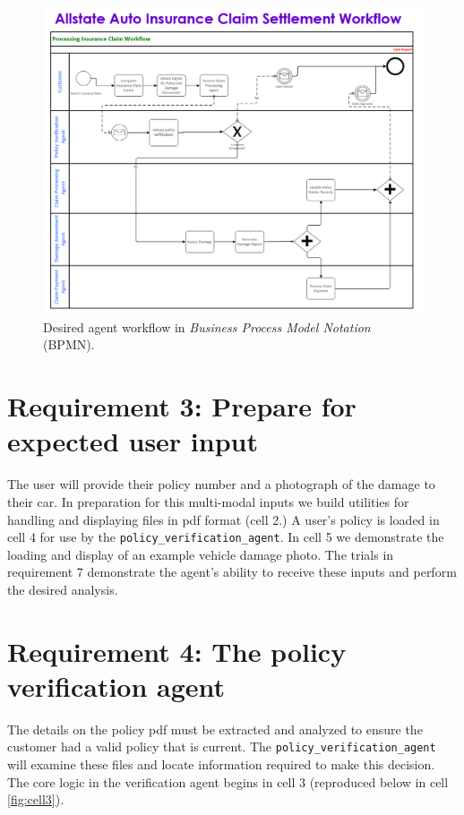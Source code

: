 \documentclass[11pt,letterpaper]{article}
\begin{document}
\begin{figure}[h!]
    \centering
    \includegraphics{BPMN.png}
    \caption{Desired agent workflow in \textit{Business Process Model Notation} (BPMN).}
    \label{fig:bpmn}
\end{figure}

\section*{Requirement 3: Prepare for expected user input}
\tab The user will provide their policy number and a photograph of the damage to their car. In preparation for this multi-modal inputs we build utilities for handling and displaying files in pdf format (cell 2.) A user's policy is loaded in cell 4 for use by the \texttt{policy\_verification\_agent}. 
In cell 5 we demonstrate the loading and display of an example vehicle damage photo. The trials in requirement 7 demonstrate the agent's ability to receive these inputs and perform the desired analysis.

\section*{Requirement 4: The policy verification agent}
\tab The details on the policy pdf must be extracted and analyzed to ensure the customer had a valid policy that is current. 
The \texttt{policy\_verification\_agent} will examine these files and locate information required to make this decision. 
The core logic in the verification agent begins in cell 3 (reproduced below in cell \ref{fig:cell3}). 
\end{document}
